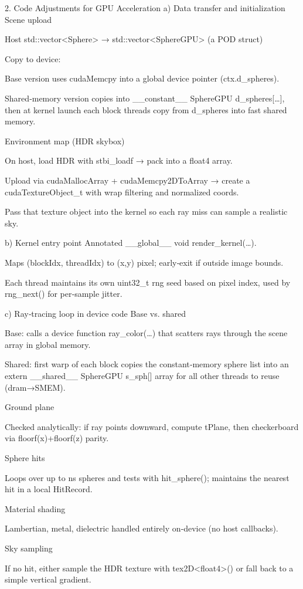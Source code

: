 2. Code Adjustments for GPU Acceleration
a) Data transfer and initialization
Scene upload

Host std::vector<Sphere> → std::vector<SphereGPU> (a POD struct)

Copy to device:

Base version uses cudaMemcpy into a global device pointer (ctx.d\_spheres).

Shared‐memory version copies into \_\_constant\_\_ SphereGPU d\_spheres[\dots], then at kernel launch each block threads copy from d\_spheres into fast shared memory.

Environment map (HDR skybox)

On host, load HDR with stbi\_loadf → pack into a float4 array.

Upload via cudaMallocArray + cudaMemcpy2DToArray → create a cudaTextureObject\_t with wrap filtering and normalized coords.

Pass that texture object into the kernel so each ray miss can sample a realistic sky.

b) Kernel entry point
Annotated \_\_global\_\_ void render\_kernel(\dots).

Maps (blockIdx, threadIdx) to (x,y) pixel; early‐exit if outside image bounds.

Each thread maintains its own uint32\_t rng seed based on pixel index, used by rng\_next() for per‐sample jitter.

c) Ray‐tracing loop in device code
Base vs. shared

Base: calls a device function ray\_color(\dots) that scatters rays through the scene array in global memory.

Shared: first warp of each block copies the constant‐memory sphere list into an extern \_\_shared\_\_ SphereGPU s\_sph[] array for all other threads to reuse (dram→SMEM).

Ground plane

Checked analytically: if ray points downward, compute tPlane, then checkerboard via floorf(x)+floorf(z) parity.

Sphere hits

Loops over up to ns spheres and tests with hit\_sphere(); maintains the nearest hit in a local HitRecord.

Material shading

Lambertian, metal, dielectric handled entirely on‐device (no host callbacks).

Sky sampling

If no hit, either sample the HDR texture with tex2D<float4>() or fall back to a simple vertical gradient.

